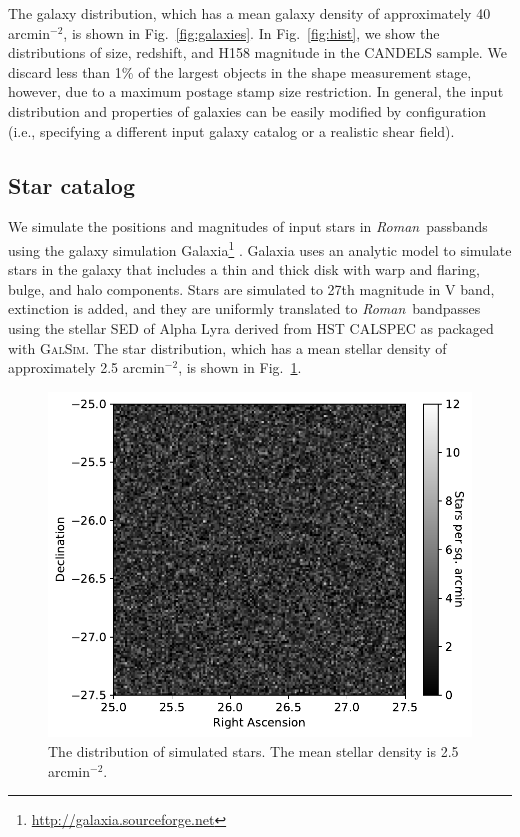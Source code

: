 \documentclass[usenatbib]{mnras}
\newcommand{\galsim}{\textsc{GalSim}}
\newcommand{\wfirst}{{\slshape Roman}}
\begin{document}
The galaxy distribution, which has a mean galaxy density of approximately 40 arcmin$^{-2}$, is shown in Fig.~\ref{fig:galaxies}. 
In Fig.~\ref{fig:hist}, we show the distributions of size, redshift, and H158 magnitude in the CANDELS sample. 
We discard less than 1\% of the largest objects in the shape measurement stage, however, due to a maximum postage stamp size restriction. 
In general, the input distribution and properties of galaxies can be easily modified by configuration (i.e., specifying a different input galaxy catalog or a realistic shear field).

\subsection{Star catalog}\label{starcat}

We simulate the positions and magnitudes of input stars in \wfirst\ passbands using the galaxy simulation Galaxia\footnote{\url{http://galaxia.sourceforge.net}} \citep{galaxia}. 
Galaxia uses an analytic model \citep{galaxia2} to simulate stars in the galaxy that includes a thin and thick disk with warp and flaring, bulge, and halo components. 
Stars are simulated to 27th magnitude in V band, extinction is added, and they are uniformly translated to \wfirst\ bandpasses using the stellar SED of Alpha Lyra derived from HST CALSPEC as packaged with \galsim.  The star distribution, which has a mean stellar density of approximately 2.5 arcmin$^{-2}$, is shown in Fig.~\ref{fig:stars}. 


\begin{figure}
\begin{center}
\includegraphics[width=\columnwidth]{figures/stars.pdf}
\end{center}
\caption[]{
The distribution of simulated stars. The mean stellar density is 2.5 arcmin$^{-2}$. 
\label{fig:stars}}
\end{figure}
\end{document}
